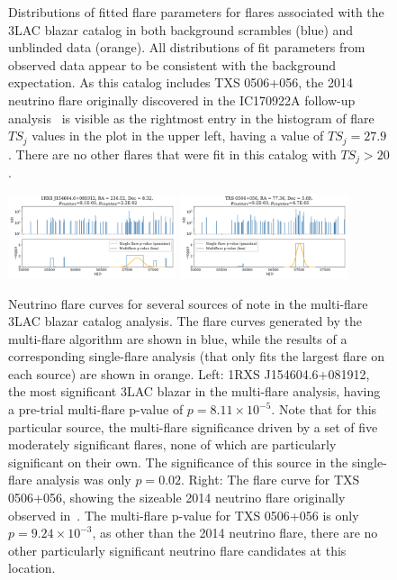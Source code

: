\begin{figure}[h]
\caption{Distributions of fitted flare parameters for flares associated with the 3LAC blazar catalog in both background scrambles (blue) and unblinded data (orange). All distributions of fit parameters from observed data appear to be consistent with the background expectation. As this catalog includes TXS 0506+056, the 2014 neutrino flare originally discovered in the IC170922A follow-up analysis~\cite{TXS_Archival} is visible as the rightmost entry in the histogram of flare $TS_j$ values in the plot in the upper left, having a value of $TS_j=27.9$. There are no other flares that were fit in this catalog with $TS_j>20$. }
\label{fig:3lacresults}
\end{figure}

\begin{figure}[h]
\centering
\includegraphics[width=0.44\textwidth]{figs/1RXS J154604.6+081912.pdf}
\includegraphics[width=0.44\textwidth]{figs/TXS 0506+056.pdf}
\caption{Neutrino flare curves for several sources of note in the multi-flare 3LAC blazar catalog analysis. The flare curves generated by the multi-flare algorithm are shown in blue, while the results of a corresponding single-flare analysis (that only fits the largest flare on each source) are shown in orange. Left: 1RXS J154604.6+081912, the most significant 3LAC blazar in the multi-flare analysis, having a pre-trial multi-flare p-value of $p=8.11 \times 10^{-5}$. Note that for this particular source, the multi-flare significance driven by a set of five moderately significant flares, none of which are particularly significant on their own. The significance of this source in the single-flare analysis was only $p=0.02$. Right: The flare curve for TXS 0506+056, showing the sizeable 2014 neutrino flare originally observed in~\cite{TXS_Archival}. The multi-flare p-value for TXS 0506+056 is only $p=9.24 \times 10^{-3}$, as other than the 2014 neutrino flare, there are no other particularly significant neutrino flare candidates at this location. }
\label{fig:3lacflarecurves}
\end{figure}

